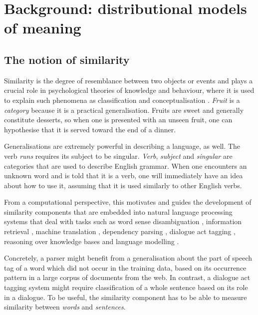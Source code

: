 \chapter{Background: distributional models of meaning}
\label{cha:background}

\section{The notion of similarity}
\label{sec:similarity}

Similarity is the degree of resemblance between two objects or events \cite{WCS:WCS1282} and plays a crucial role in psychological theories of knowledge and behaviour, where it is used to explain such phenomena as classification and conceptualisation \cite{Tversky1977,1986-13502-00119860101,medin1993respects,Markman1996,hahn1997concepts}. \textit{Fruit} is a \emph{category} because it is a practical generalisation. Fruits are sweet and generally constitute desserts, so when one is presented with an unseen fruit, one can hypothesise that it is served toward the end of a dinner.

Generalisations are extremely powerful in describing a language, as well. The verb \textit{runs} requires its subject to be singular. \textit{Verb}, \textit{subject} and \textit{singular} are categories that are used to describe English grammar. When one encounters an unknown word and is told that it is a verb, one will immediately have an idea about how to use it, assuming that it is used similarly to other English verbs.

From a computational perspective, this motivates and guides the development of similarity components that are embedded into natural language processing systems that deal with tasks such as
word sense disambiguation \cite{Schutze:1998:AWS:972719.972724},
information retrieval \cite{Salton:1975:VSM:361219.361220,Milajevs:2015:IMN:2808194.2809448},
machine translation \cite{Dagan:1993:CWS:981574.981596},
dependency parsing \cite{hermann-blunsom:2013:ACL2013,andreas-klein:2014:P14-2},
dialogue act tagging \cite{kalchbrenner-blunsom:2013:CVSC,milajevs-purver:2014:CVSC},
reasoning over knowledge bases \cite{NIPS2013_5028}
and language modelling \cite{bengio2006}.

Concretely, a parser might benefit from a generalisation about the part of speech tag of a word which did not occur in the training data, based on its occurrence pattern in a large corpus of documents from the web. In contrast, a dialogue act tagging system might require classification of a whole sentence based on its role in a dialogue. To be useful, the similarity component has to be able to measure similarity between \emph{words} and \emph{sentences}.

